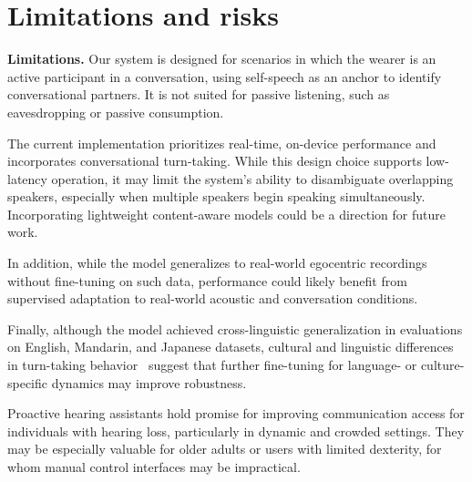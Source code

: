 \section{Limitations and risks}

{\bf Limitations.} Our system is designed for scenarios in which the wearer is an active participant in a conversation, using self-speech as an anchor to identify conversational partners. It is not suited for passive listening, such as eavesdropping or passive consumption. %



The current implementation prioritizes real-time, on-device performance and  incorporates conversational turn-taking. While this design choice supports low-latency operation, it may limit the system's ability to disambiguate overlapping speakers, especially when multiple speakers begin speaking simultaneously. Incorporating lightweight content-aware models could be a direction for future work.




In addition, while the model generalizes to real-world egocentric  recordings without fine-tuning on such data, performance could likely benefit from supervised adaptation to real-world {acoustic and conversation} conditions.

{Finally, although the model achieved cross-linguistic generalization in evaluations on English, Mandarin, and Japanese datasets}, cultural and linguistic differences in turn-taking behavior~\cite{turntake2} suggest that further fine-tuning for language- or culture-specific dynamics may improve robustness.
 


\vskip 0.05in 
Proactive hearing assistants hold promise for improving communication access for individuals with hearing loss, particularly in dynamic and crowded settings. They may be especially valuable for older adults or users with limited dexterity, for whom manual control interfaces may be impractical.


